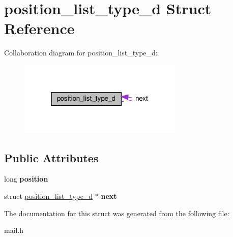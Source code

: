\hypertarget{structposition__list__type__d}{}\section{position\+\_\+list\+\_\+type\+\_\+d Struct Reference}
\label{structposition__list__type__d}


Collaboration diagram for position\+\_\+list\+\_\+type\+\_\+d\+:
\nopagebreak
\begin{figure}[H]
\begin{center}
\leavevmode
\includegraphics[width=223pt]{structposition__list__type__d__coll__graph}
\end{center}
\end{figure}
\subsection*{Public Attributes}
\begin{DoxyCompactItemize}
\item 
\mbox{\label{structposition__list__type__d_a94ceaa3fd177d4151e309a601d69a770}} 
long {\bfseries position}
\item 
\mbox{\label{structposition__list__type__d_a5cf586c39cb637e63cf6b7c9e7ca77d3}} 
struct \hyperlink{structposition__list__type__d}{position\+\_\+list\+\_\+type\+\_\+d} $\ast$ {\bfseries next}
\end{DoxyCompactItemize}


The documentation for this struct was generated from the following file\+:\begin{DoxyCompactItemize}
\item 
mail.\+h\end{DoxyCompactItemize}
